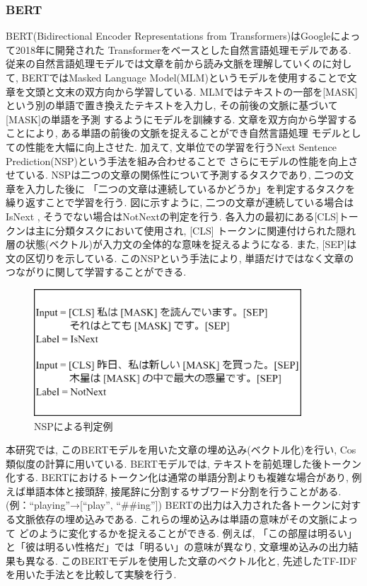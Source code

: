 \documentclass{ltjarticle}
\begin{document}
\subsubsection{BERT}
BERT(Bidirectional Encoder Representations from Transformers)はGoogleによって2018年に開発された
Transformerをベースとした自然言語処理モデルである. 従来の自然言語処理モデルでは文章を前から読み文脈を理解していくのに対して, 
BERTではMasked Language Model(MLM)というモデルを使用することで文章を文頭と文末の双方向から学習している. 
MLMではテキストの一部を[MASK]という別の単語で置き換えたテキストを入力し, その前後の文脈に基づいて[MASK]の単語を予測
するようにモデルを訓練する. 文章を双方向から学習することにより, ある単語の前後の文脈を捉えることができ自然言語処理
モデルとしての性能を大幅に向上させた. 加えて, 文単位での学習を行うNext Sentence Prediction(NSP)という手法を組み合わせることで
さらにモデルの性能を向上させている. NSPは二つの文章の関係性について予測するタスクであり, 二つの文章を入力した後に
「二つの文章は連続しているかどうか」を判定するタスクを繰り返すことで学習を行う. 図に示すように, 二つの文章が連続している場合はIsNext
, そうでない場合はNotNextの判定を行う. 各入力の最初にある[CLS]トークンは主に分類タスクにおいて使用され, [CLS]
トークンに関連付けられた隠れ層の状態(ベクトル)が入力文の全体的な意味を捉えるようになる. また, [SEP]は文の区切りを示している. 
このNSPという手法により, 単語だけではなく文章のつながりに関して学習することができる. 
\vspace{10truept}

\begin{figure}[ht]
    \centering
    \includegraphics[width=10cm]{images/BERT.drawio.png}
    \caption{NSPによる判定例}
    \label{fig:BERT}
\end{figure}
\newpage

本研究では, このBERTモデルを用いた文章の埋め込み(ベクトル化)を行い, Cos類似度の計算に用いている. 
BERTモデルでは, テキストを前処理した後トークン化する. BERTにおけるトークン化は通常の単語分割よりも複雑な場合があり, 
例えば単語本体と接頭辞, 接尾辞に分割するサブワード分割を行うことがある. (例：``playing''→[``play'', ``\#\#ing''])
BERTの出力は入力された各トークンに対する文脈依存の埋め込みである. これらの埋め込みは単語の意味がその文脈によって
どのように変化するかを捉えることができる. 例えば, 「この部屋は明るい」と「彼は明るい性格だ」では「明るい」の意味が異なり, 
文章埋め込みの出力結果も異なる. 
このBERTモデルを使用した文章のベクトル化と, 先述したTF-IDFを用いた手法とを比較して実験を行う. 
\end{document}
